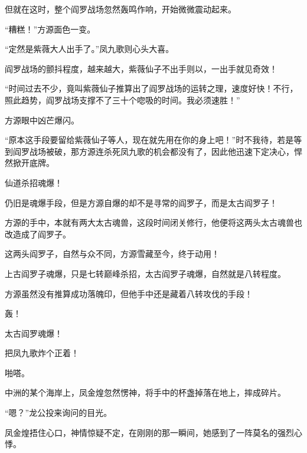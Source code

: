 \begin{this_body}
但就在这时，整个阎罗战场忽然轰鸣作响，开始微微震动起来。

“糟糕！”方源面色一变。

“定然是紫薇大人出手了。”凤九歌则心头大喜。

阎罗战场的颤抖程度，越来越大，紫薇仙子不出手则以，一出手就见奇效！

“时间过去不少，竟叫紫薇仙子推算出了阎罗战场的运转之理，速度好快！不行，照此趋势，阎罗战场支撑不了三十个唿吸的时间。我必须速胜！”

方源眼中凶芒爆闪。

“原本这手段要留给紫薇仙子等人，现在就先用在你的身上吧！”时不我待，若是等到阎罗战场被破，那方源连杀死凤九歌的机会都没有了，因此他迅速下定决心，悍然掀开底牌。

仙道杀招魂爆！

仍旧是魂爆手段，但是方源自爆的却不是寻常的阎罗子，而是太古阎罗子！

方源的手中，本就有两大太古魂兽，这段时间闭关修行，他便将这两头太古魂兽也改造成了阎罗子。

这两头阎罗子，自然与众不同，方源雪藏至今，终于动用！

上古阎罗子魂爆，只是七转巅峰杀招，太古阎罗子魂爆，自然就是八转程度。

方源虽然没有推算成功落魄印，但他手中还是藏着八转攻伐的手段！

轰！

太古阎罗魂爆！

把凤九歌炸个正着！

啪嗒。

中洲的某个海岸上，凤金煌忽然愣神，将手中的杯盏掉落在地上，摔成碎片。

“嗯？”龙公投来询问的目光。

凤金煌捂住心口，神情惊疑不定，在刚刚的那一瞬间，她感到了一阵莫名的强烈心悸。

\end{this_body}

